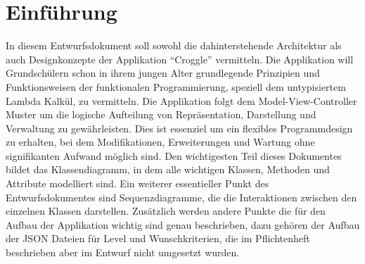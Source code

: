 \chapter{Einführung}

In diesem Entwurfsdokument soll sowohl die dahinterstehende Architektur als auch Designkonzepte der Applikation "`Croggle"' vermitteln.
Die Applikation will Grundschülern schon in ihrem jungen Alter grundlegende Prinzipien und Funktionsweisen der funktionalen Programmierung, speziell dem untypisiertem Lambda Kalkül, zu vermitteln.
Die Applikation folgt dem Model-View-Controller Muster um die logische Aufteilung von Repräsentation, Darstellung und Verwaltung zu gewährleisten.
Dies ist essenziel um ein flexibles Programmdesign zu erhalten, bei dem Modifikationen, Erweiterungen und Wartung ohne signifikanten Aufwand möglich sind.
Den wichtigesten Teil dieses Dokumentes bildet das Klassendiagramm, in dem alle wichtigen Klassen, Methoden und Attribute modelliert sind.
Ein weiterer essentieller Punkt des Entwurfsdokumentes sind Sequenzdiagramme, die die Interaktionen zwischen den einzelnen Klassen darstellen.
Zusätzlich werden andere Punkte die für den Aufbau der Applikation wichtig sind genau beschrieben, dazu gehören der Aufbau der JSON Dateien für Level und Wunschkriterien, die im Pflichtenheft beschrieben aber im Entwurf nicht umgesetzt wurden.

